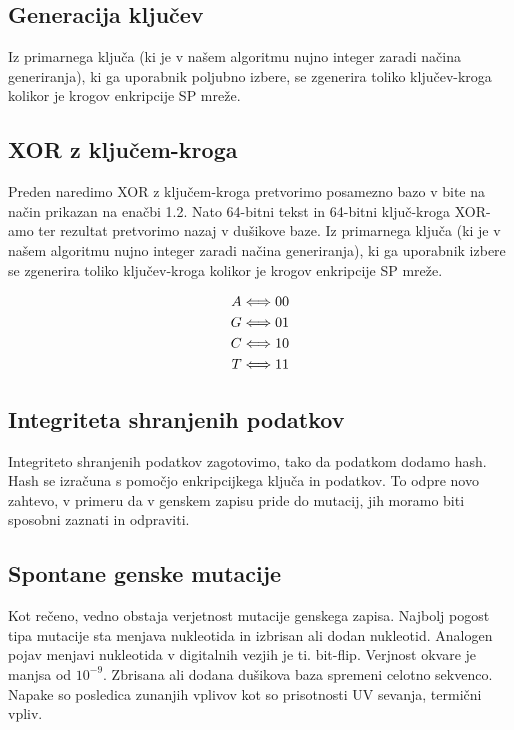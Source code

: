 \documentclass[graybox, envcountchap]{svmult}
\begin{document}
\subsection{Generacija ključev}
Iz primarnega ključa (ki je v našem algoritmu nujno integer zaradi načina generiranja), ki ga uporabnik poljubno izbere, se zgenerira toliko ključev-kroga kolikor je krogov enkripcije SP mreže.
\subsection{XOR z ključem-kroga}
\label{g01:subsec:2}

Preden naredimo XOR z ključem-kroga pretvorimo posamezno bazo v bite na način prikazan na enačbi 1.2. Nato 64-bitni tekst in 64-bitni ključ-kroga XOR-amo ter rezultat pretvorimo nazaj v dušikove baze.
Iz primarnega ključa (ki je v našem algoritmu nujno integer zaradi načina generiranja), ki ga uporabnik izbere se zgenerira toliko ključev-kroga kolikor je krogov enkripcije SP mreže.

\begin{equation}
\begin{split}
\small 
A \Longleftrightarrow 00 \\
G \Longleftrightarrow 01 \\
C \Longleftrightarrow 10 \\
T \Longleftrightarrow 11 \\
\end{split}
\end{equation}


\subsection{Integriteta shranjenih podatkov}
\label{g01:subsec:2}
Integriteto shranjenih podatkov zagotovimo, tako da podatkom dodamo hash. Hash se izračuna s pomočjo enkripcijkega ključa in podatkov. To odpre novo zahtevo, v primeru da v genskem zapisu pride do mutacij, jih moramo biti sposobni zaznati in odpraviti. 

\subsection{Spontane genske mutacije}
\label{g01:subsec:2}
Kot rečeno, vedno obstaja verjetnost mutacije genskega zapisa. Najbolj pogost tipa mutacije sta menjava nukleotida in izbrisan ali dodan nukleotid. Analogen pojav menjavi nukleotida v digitalnih vezjih je ti. bit-flip. Verjnost okvare je manjsa od $10^{-9}$. Zbrisana ali dodana dušikova baza spremeni celotno sekvenco. Napake so posledica zunanjih vplivov kot so prisotnosti UV sevanja, termični vpliv.
\end{document}
